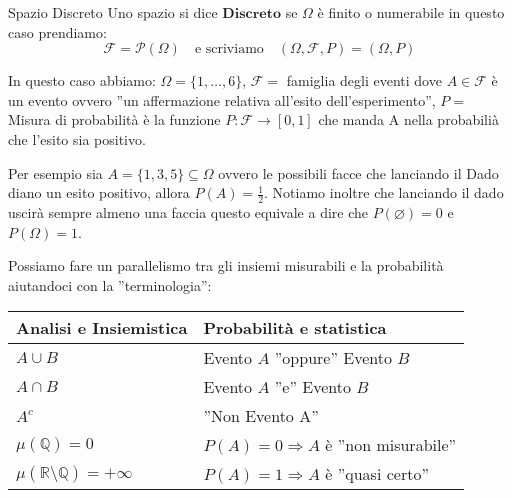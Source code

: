\documentclass[11pt, a4paper, twoside]{article}
\begin{document}
\begin{defn}{Spazio Discreto}{}
	Uno spazio si dice $\textbf{Discreto}$ se $\Omega$ è finito o numerabile in questo caso prendiamo:
	\[
		\mathcal F =\mathcal P(\Omega)\quad \text{e scriviamo}\quad (\Omega,\mathcal F, P)=(\Omega, P)
	\]
\end{defn}
\begin{es}
	In questo caso abbiamo: $\Omega=\{1,\dots,6\}$, $\mathcal F=$ famiglia degli eventi dove $A\in\mathcal F$ è un evento ovvero ''un affermazione relativa all'esito dell'esperimento'', $P=$ Misura di probabilità è la funzione $P:\mathcal F\rightarrow[0,1]$ che manda A nella probabilià che l'esito sia positivo.

Per esempio sia $A= \{1,3,5\}\subseteq \Omega$ ovvero le possibili facce che lanciando il Dado diano un esito positivo, allora $P(A)=\frac{1}{2}$. Notiamo inoltre che lanciando il dado uscirà sempre almeno una faccia questo equivale a dire che $P(\varnothing)=0$ e $P(\Omega)=1$.
\end{es}
\begin{oss}
	Possiamo fare un parallelismo tra gli insiemi misurabili e la probabilità aiutandoci con la ''terminologia'':
	\begin{center}
		\begin{tabular}{|l|l|}
			\hline
			\textbf{Analisi e Insiemistica} & \textbf{Probabilità e statistica}\\
			\hline
			{$A\cup B$} & {Evento $A$ ''oppure'' Evento $B$}\\
			\hline
			{$A\cap B$} & {Evento $A$ ''e'' Evento $B$}\\
			\hline
			{$A^c$} & {''Non Evento A''}\\
			\hline
			{$\mu(\mathbb{Q})=0$} & {$P(A)=0\Rightarrow A$ è ''non misurabile''}\\
			\hline
			{$\mu(\mathbb{R}\setminus\mathbb{Q})=+\infty$} & {$P(A)=1\Rightarrow A$ è ''quasi certo''}\\
			\hline
		\end{tabular}
	\end{center}
\end{oss}
\end{document}
